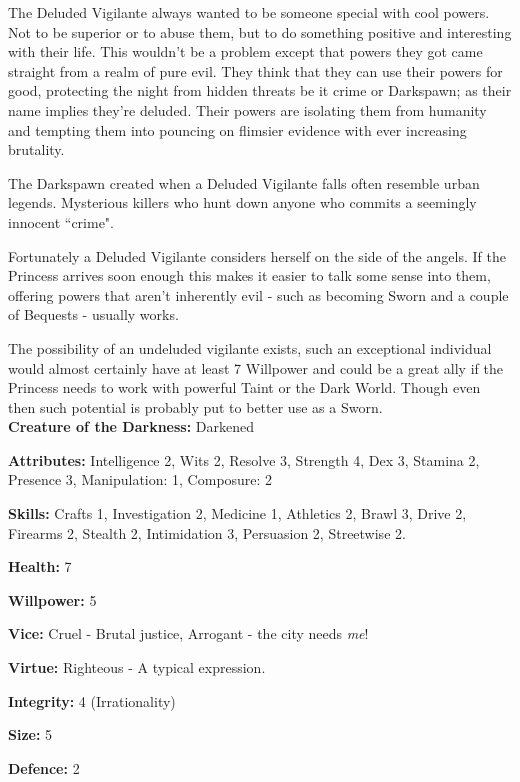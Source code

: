 The Deluded Vigilante always wanted to be someone special with cool powers. Not to be superior or to abuse them, but to do something positive and interesting with their life. This wouldn't be a problem except that powers they got came straight from a realm of pure evil. They think that they can use their powers for good, protecting the night from hidden threats be it crime or Darkspawn; as their name implies they're deluded. Their powers are isolating them from humanity and tempting them into pouncing on flimsier evidence with ever increasing brutality.

The Darkspawn created when a Deluded Vigilante falls often resemble urban legends. Mysterious killers who hunt down anyone who commits a seemingly innocent \textquotedblleft crime".

Fortunately a Deluded Vigilante considers herself on the side of the angels. If the Princess arrives soon enough this makes it easier to talk some sense into them, offering powers that aren't inherently evil - such as becoming Sworn and a couple of Bequests - usually works.

The possibility of an undeluded vigilante exists, such an exceptional individual would almost certainly have at least 7 Willpower and could be a great ally if the Princess needs to work with powerful Taint or the Dark World. Though even then such potential is probably put to better use as a Sworn. \\

\noindent \textbf{Creature of the Darkness:} Darkened 

\noindent \textbf{Attributes:} Intelligence 2, Wits 2, Resolve 3, Strength 4, Dex 3, Stamina 2, Presence 3, Manipulation: 1, Composure: 2

\noindent \textbf{Skills:} Crafts 1, Investigation 2, Medicine 1, Athletics 2, Brawl 3, Drive 2, Firearms 2, Stealth 2, Intimidation 3, Persuasion 2, Streetwise 2.

\noindent \textbf{Health:} 7

\noindent \textbf{Willpower:} 5

\noindent \textbf{Vice:} Cruel - Brutal justice, Arrogant - the city needs \textit{me}!

\noindent \textbf{Virtue:} Righteous - A typical expression.

\noindent \textbf{Integrity:} 4 (Irrationality)

\noindent \textbf{Size:} 5

\noindent \textbf{Defence:} 2


